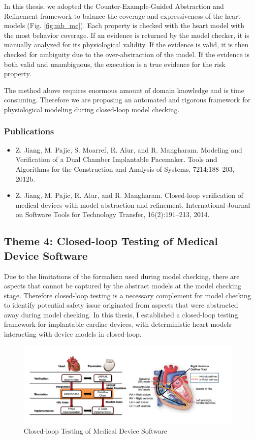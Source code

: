 \documentclass[a4paper]{article}
\begin{document}
In this thesis, we adopted the Counter-Example-Guided Abstraction and Refinement framework to balance the coverage and expressiveness of the heart models (Fig. \ref{fig:mb_mc}).
Each property is checked with the heart model with the most behavior coverage.
If an evidence is returned by the model checker, it is manually analyzed for its physiological validity.
If the evidence is valid, it is then checked for ambiguity due to the over-abstraction of the model. 
If the evidence is both valid and unambiguous, the execution is a true evidence for the risk property.

The method above requires enormous amount of domain knowledge and is time consuming.
Therefore we are proposing an automated and rigorous framework for physiological modeling during closed-loop model checking.
\subsubsection{Publications}
\begin{itemize}
\item Z. Jiang, M. Pajic, S. Moarref, R. Alur, and R. Mangharam. Modeling and Verification
of a Dual Chamber Implantable Pacemaker. Tools and Algorithms for the
Construction and Analysis of Systems, 7214:188–203, 2012b.
\item Z. Jiang, M. Pajic, R. Alur, and R. Mangharam. Closed-loop verification of medical
devices with model abstraction and refinement. International Journal on Software
Tools for Technology Transfer, 16(2):191–213, 2014.
\end{itemize}

\newpage
\subsection{Theme 4: Closed-loop Testing of Medical Device Software}
Due to the limitations of the formalism used during model checking, there are aspects that cannot be captured by the abstract models at the model checking stage.
Therefore closed-loop testing is a necessary complement for model checking to identify potential safety issue originated from aspects that were abstracted away during model checking. 
In this thesis, I established a closed-loop testing framework for implantable cardiac devices, with deterministic heart models interacting with device models in closed-loop.
\begin{figure}[t]
	\centering
	\includegraphics[scale=0.32]{figs/mb_sim.pdf}
	\caption{\small Closed-loop Testing of Medical Device Software}
	\label{fig:mb_sim}
\end{figure}
\end{document}
